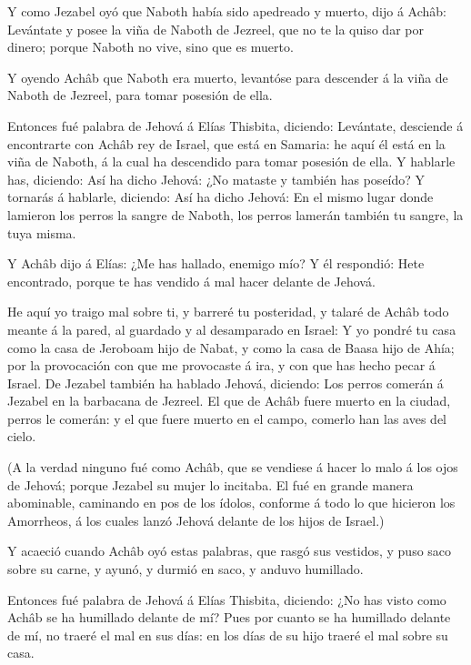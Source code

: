 Y como Jezabel oyó que Naboth había sido apedreado y
muerto, dijo á Achâb: Levántate y posee la viña de Naboth de Jezreel,
que no te la quiso dar por dinero; porque Naboth no vive, sino que es
muerto.

 Y oyendo Achâb que Naboth era muerto, levantóse para
descender á la viña de Naboth de Jezreel, para tomar posesión de ella.

 Entonces fué palabra de Jehová á Elías Thisbita, diciendo:
 Levántate, desciende á encontrarte con Achâb rey de
Israel, que está en Samaria: he aquí él está en la viña de Naboth, á la
cual ha descendido para tomar posesión de ella.  Y hablarle
has, diciendo: Así ha dicho Jehová: ¿No mataste y también has poseído? Y
tornarás á hablarle, diciendo: Así ha dicho Jehová: En el mismo lugar
donde lamieron los perros la sangre de Naboth, los perros lamerán
también tu sangre, la tuya misma.

 Y Achâb dijo á Elías: ¿Me has hallado, enemigo mío? Y él
respondió: Hete encontrado, porque te has vendido á mal hacer delante de
Jehová.

 He aquí yo traigo mal sobre ti, y barreré tu posteridad, y
talaré de Achâb todo meante á la pared, al guardado y al desamparado en
Israel:  Y yo pondré tu casa como la casa de Jeroboam hijo
de Nabat, y como la casa de Baasa hijo de Ahía; por la provocación con
que me provocaste á ira, y con que has hecho pecar á Israel.
 De Jezabel también ha hablado Jehová, diciendo: Los perros
comerán á Jezabel en la barbacana de Jezreel.  El que de
Achâb fuere muerto en la ciudad, perros le comerán: y el que fuere
muerto en el campo, comerlo han las aves del cielo.

 (A la verdad ninguno fué como Achâb, que se vendiese á
hacer lo malo á los ojos de Jehová; porque Jezabel su mujer lo incitaba.
 El fué en grande manera abominable, caminando en pos de
los ídolos, conforme á todo lo que hicieron los Amorrheos, á los cuales
lanzó Jehová delante de los hijos de Israel.)

 Y acaeció cuando Achâb oyó estas palabras, que rasgó sus
vestidos, y puso saco sobre su carne, y ayunó, y durmió en saco, y
anduvo humillado.

 Entonces fué palabra de Jehová á Elías Thisbita, diciendo:
 ¿No has visto como Achâb se ha humillado delante de mí?
Pues por cuanto se ha humillado delante de mí, no traeré el mal en sus
días: en los días de su hijo traeré el mal sobre su casa.

